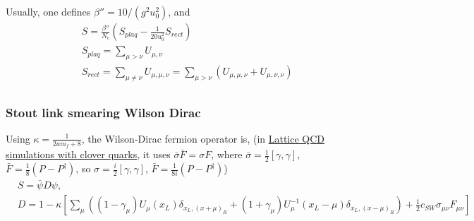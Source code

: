 Usually, one defines $\beta''=10/(g^2u_0^2)$, and
\begin{equation}
\begin{split}
&S=\frac{\beta''}{N_c}\left(S_{plaq}- \frac{1}{20u_0^2} S_{rect}\right)\\
&S_{plaq}=\sum _{\mu>\nu}U_{\mu,\nu}\\
&S_{rect}=\sum _{\mu\neq \nu}U_{\mu,\mu,\nu}=\sum _{\mu>\nu}\left(U_{\mu,\mu,\nu}+U_{\mu,\nu,\nu}\right)\\
\end{split}
\end{equation}

\subsubsection{\label{StoutlinkWilsonDirac}Stout link smearing Wilson Dirac}

Using $\kappa=\frac{1}{2am_f+8}$, the Wilson-Dirac fermion operator is, (in \href{https://research.kek.jp/people/matufuru/Research/Docs/Bridge/Clover_HMC/note_cloverHMC_1.3.1.pdf}{Lattice QCD simulations with clover quarks}, it uses $\bar{\sigma}\bar{F}=\sigma F$, where $\bar{\sigma}=\frac{1}{2}[\gamma ,\gamma]$, $\bar{F}=\frac{1}{8}(P-P^{\dagger})$, so $\sigma=\frac{i}{2}[\gamma ,\gamma]$, $\bar{F}=\frac{1}{8i}(P-P^{\dagger})$)
\begin{equation}
\begin{split}
&S=\bar{\psi}D\psi,\\    
&D=1-\kappa\left[\sum _{\mu}\left((1-\gamma _{\mu})U_{\mu}(x _L)\delta _{x _L,(x+\mu)_R}+(1+\gamma _{\mu})U_{\mu}^{-1}(x _L-\mu)\delta _{x_L,(x-\mu)_R}\right)+\frac{1}{2}c_{SW}\sigma_{\mu\nu}F_{\mu\nu}\right]\\
\end{split}
\end{equation}

